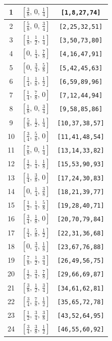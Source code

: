 \documentclass[fleqn,8pt]{jsarticle}
\begin{document}
\begin{longtable}{ccc}
1 & $\left[ \frac{3}{8},\, 0,\, \frac{1}{4} \right]$ & {\tt [1,8,27,74]} \\ \hline
2 & $\left[ \frac{5}{8},\, 0,\, \frac{3}{4} \right]$ & {\tt [2,25,32,51]} \\ \hline
3 & $\left[ \frac{1}{8},\, \frac{1}{2},\, \frac{1}{4} \right]$ & {\tt [3,50,73,80]} \\ \hline
4 & $\left[ 0,\, \frac{1}{4},\, \frac{7}{8} \right]$ & {\tt [4,16,47,91]} \\ \hline
5 & $\left[ 0,\, \frac{3}{4},\, \frac{5}{8} \right]$ & {\tt [5,42,45,63]} \\ \hline
6 & $\left[ \frac{1}{4},\, \frac{1}{8},\, \frac{1}{2} \right]$ & {\tt [6,59,89,96]} \\ \hline
7 & $\left[ \frac{1}{4},\, \frac{7}{8},\, 0 \right]$ & {\tt [7,12,44,94]} \\ \hline
8 & $\left[ \frac{1}{8},\, 0,\, \frac{3}{4} \right]$ & {\tt [9,58,85,86]} \\ \hline
9 & $\left[ \frac{5}{8},\, \frac{1}{2},\, \frac{1}{4} \right]$ & {\tt [10,37,38,57]} \\ \hline
10 & $\left[ \frac{3}{4},\, \frac{5}{8},\, 0 \right]$ & {\tt [11,41,48,54]} \\ \hline
11 & $\left[ \frac{7}{8},\, 0,\, \frac{1}{4} \right]$ & {\tt [13,14,33,82]} \\ \hline
12 & $\left[ \frac{1}{2},\, \frac{1}{4},\, \frac{1}{8} \right]$ & {\tt [15,53,90,93]} \\ \hline
13 & $\left[ \frac{1}{4},\, \frac{3}{8},\, 0 \right]$ & {\tt [17,24,30,83]} \\ \hline
14 & $\left[ 0,\, \frac{1}{4},\, \frac{3}{8} \right]$ & {\tt [18,21,39,77]} \\ \hline
15 & $\left[ \frac{1}{2},\, \frac{1}{4},\, \frac{5}{8} \right]$ & {\tt [19,28,40,71]} \\ \hline
16 & $\left[ \frac{3}{4},\, \frac{1}{8},\, 0 \right]$ & {\tt [20,70,79,84]} \\ \hline
17 & $\left[ \frac{1}{4},\, \frac{5}{8},\, \frac{1}{2} \right]$ & {\tt [22,31,36,68]} \\ \hline
18 & $\left[ 0,\, \frac{3}{4},\, \frac{1}{8} \right]$ & {\tt [23,67,76,88]} \\ \hline
19 & $\left[ \frac{7}{8},\, \frac{1}{2},\, \frac{3}{4} \right]$ & {\tt [26,49,56,75]} \\ \hline
20 & $\left[ \frac{1}{2},\, \frac{3}{4},\, \frac{7}{8} \right]$ & {\tt [29,66,69,87]} \\ \hline
21 & $\left[ \frac{3}{8},\, \frac{1}{2},\, \frac{3}{4} \right]$ & {\tt [34,61,62,81]} \\ \hline
22 & $\left[ \frac{3}{4},\, \frac{7}{8},\, \frac{1}{2} \right]$ & {\tt [35,65,72,78]} \\ \hline
23 & $\left[ \frac{1}{2},\, \frac{3}{4},\, \frac{3}{8} \right]$ & {\tt [43,52,64,95]} \\ \hline
24 & $\left[ \frac{3}{4},\, \frac{3}{8},\, \frac{1}{2} \right]$ & {\tt [46,55,60,92]} \\
\end{longtable}
\end{document}

